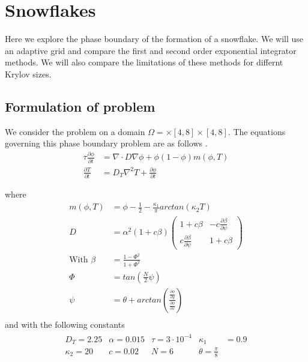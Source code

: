 \section {Snowflakes}
Here we explore the phase boundary of the formation of a snowflake.
We will use an adaptive grid and compare the first and second order exponential integrator methods.
We will also compare the limitations of these methods for differnt Krylov sizes.
\subsection{Formulation of problem}

We consider the problem on a domain $\Omega = \times [4, 8] \times [4, 8]$.
The equations governing this phase boundary problem are as follows \cite{Kobayashi1993}.
\begin{align*}
    \tau \frac{\partial \phi}{\partial t} &= \nabla \cdot D\nabla\phi +  \phi(1-\phi)m(\phi,T)\\
    \frac{\partial T}{\partial t} &= D_T \nabla ^2T + \frac{\partial \phi}{\partial t}
\end{align*}

where
\begin{align*}
    m(\phi, T) &= \phi - \frac 12 - \frac{\kappa_1}{\pi}arctan(\kappa_2 T)\\
    D &= \alpha^2(1+c\beta)
    \begin{pmatrix}
        1+c\beta & -c\frac{\partial\beta}{\partial\psi}\\
        c\frac{\partial\beta}{\partial\psi} & 1+c\beta
    \end{pmatrix}\\
    \text{With }\beta &= \frac{1-\Phi^2}{1+\Phi^2}\\
    \Phi &= tan(\frac N2\psi)\\
    \psi &= \theta + arctan(\frac{\frac{\partial \phi}{\partial y}}{\frac{\partial \phi}{\partial x}})\\
\end{align*}
and with the following constants
\begin{align*}
    \begin{matrix}
    D_T = 2.25 & \alpha = 0.015 & \tau = 3\cdot 10^{-4} & \kappa_1 &= 0.9\\
    \kappa_2 = 20 & c = 0.02 & N = 6 & \theta = \frac{\pi}8
    \end{matrix}
\end{align*}

